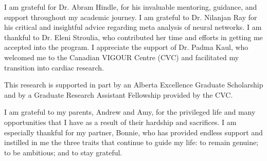 \documentclass[\main/thesis.tex]{subfiles}
\begin{document}
\begin{acknowledgements} 

I am grateful for Dr. Abram Hindle, for his invaluable mentoring, guidance, and support throughout my academic journey.
I am grateful to Dr. Nilanjan Ray for his critical and insightful advice regarding meta analysis of neural networks.
I am thankful to Dr. Eleni Stroulia, who contributed her time and efforts in getting me accepted into the program.
I appreciate the support of Dr. Padma Kaul, who welcomed me to the Canadian VIGOUR Centre (CVC) and facilitated my transition into cardiac research.

This research is supported in part by an Alberta Excellence Graduate Scholarship and by a Graduate Research Assistant Fellowship provided by the CVC.

I am grateful to my parents, Andrew and Amy, for the privileged life and many opportunities that I have as a result of their hardship and sacrifices.
I am especially thankful for my partner, Bonnie, who has provided endless support and instilled in me the three traits that continue to guide my life: to remain genuine; to be ambitious; and to stay grateful.

\end{acknowledgements}
\end{document}

